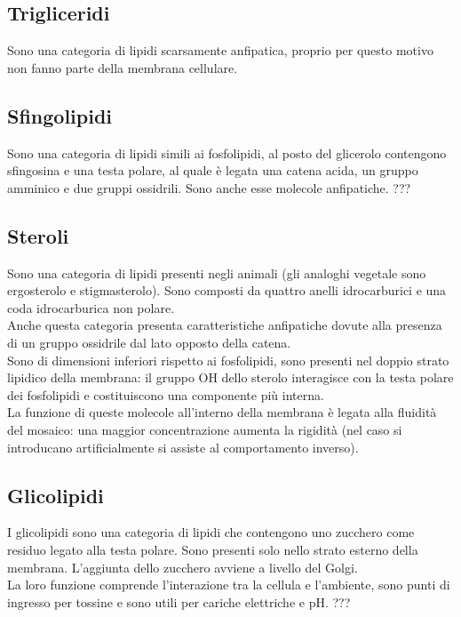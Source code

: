     \subsection{Trigliceridi}
        Sono una categoria di lipidi scarsamente anfipatica, proprio per questo motivo non fanno parte della membrana cellulare.
        
    \subsection{Sfingolipidi}
        Sono una categoria di lipidi simili ai fosfolipidi, al posto del glicerolo contengono sfingosina e una testa polare, al quale è legata una catena acida, un gruppo amminico e due gruppi ossidrili. Sono anche esse molecole anfipatiche. ???
        
    \subsection{Steroli}
        Sono una categoria di lipidi presenti negli animali (gli analoghi vegetale sono ergosterolo e stigmasterolo).
        Sono composti da quattro anelli idrocarburici e una coda idrocarburica non polare.\\
        Anche questa categoria presenta caratteristiche anfipatiche dovute alla presenza di un gruppo ossidrile dal lato opposto della catena.\\
        Sono di dimensioni inferiori rispetto ai fosfolipidi, sono presenti nel doppio strato lipidico della membrana: il gruppo OH dello sterolo interagisce con la testa polare dei fosfolipidi e costituiscono una componente più interna.\\
        La funzione di queste molecole all'interno della membrana è legata alla fluidità del mosaico: una maggior concentrazione aumenta la rigidità (nel caso si introducano artificialmente si assiste al comportamento inverso).
        
    \subsection{Glicolipidi}
        I glicolipidi sono una categoria di lipidi che contengono uno zucchero come residuo legato alla testa polare. Sono presenti solo nello strato esterno della membrana. L'aggiunta dello zucchero avviene a livello del Golgi. \\
        La loro funzione comprende l'interazione tra la cellula e l'ambiente, sono punti di ingresso per tossine e sono utili per cariche elettriche e pH. ???
    
